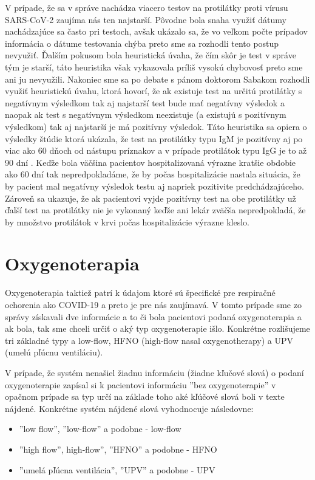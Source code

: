 V prípade, že sa v správe nachádza viacero testov na protilátky proti vírusu SARS-CoV-2 zaujíma nás ten najstarší. Pôvodne bola snaha využiť dátumy nachádzajúce sa často pri testoch, avšak ukázalo sa, že vo veľkom počte prípadov informácia o dátume testovania chýba preto sme sa rozhodli tento postup nevyužiť. Ďalším pokusom bola heuristická úvaha, že čím skôr je test v správe tým je starší, táto heuristika však vykazovala príliš vysokú chybovosť preto sme ani ju nevyužili. Nakoniec sme sa po debate s pánom doktorom Sabakom rozhodli využiť heuristickú úvahu, ktorá hovorí, že ak existuje test na určitú protilátky s negatívnym výsledkom tak aj najstarší test bude mať negatívny výsledok a naopak ak test s negatívnym výsledkom neexistuje (a existujú s pozitívnym výsledkom) tak aj najstarší je má pozitívny výsledok. Táto heuristika sa opiera o výsledky štúdie ktorá ukázala, že test na protilátky typu IgM je pozitívny aj po viac ako 60 dňoch od nástupu príznakov a v prípade protilátok typu IgG je to až 90 dní \cite{antibodies}. Keďže bola väčšina pacientov hospitalizovaná výrazne kratšie obdobie ako 60 dní tak nepredpokladáme, že by počas hospitalizácie nastala situácia, že by pacient mal negatívny výsledok testu aj napriek pozitivite predchádzajúceho. Zároveň sa ukazuje, že ak pacientovi vyjde pozitívny test na obe protilátky už ďalší test na protilátky nie je vykonaný keďže ani lekár zväčša nepredpokladá, že by množstvo protilátok v krvi počas hospitalizácie výrazne kleslo.

\section{Oxygenoterapia}

Oxygenoterapia taktiež patrí k údajom ktoré sú špecifické pre respiračné ochorenia ako COVID-19 a preto je pre nás zaujímavá. V tomto prípade sme zo správy získavali dve informácie a to či bola pacientovi podaná oxygenoterapia a ak bola, tak sme chceli určiť o aký typ oxygenoterapie išlo. Konkrétne rozlišujeme tri základné typy a low-flow, HFNO (high-flow nasal oxygenotherapy) a UPV (umelú pľúcnu ventiláciu). 

V prípade, že systém nenašiel žiadnu informáciu (žiadne kľučové slová) o podaní oxygenoterapie zapísal si k pacientovi informáciu ''bez oxygenoterapie'' v opačnom prípade sa typ určí na základe toho aké kľúčové slová boli v texte nájdené. Konkrétne systém nájdené slová vyhodnocuje následovne:

\begin{itemize}
	\item ''low flow'', ''low-flow'' a podobne - low-flow
	\item ''high flow'', high-flow'', ''HFNO'' a podobne - HFNO
	\item ''umelá pľúcna ventilácia'', ''UPV'' a podobne - UPV
\end{itemize}

